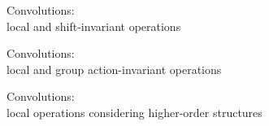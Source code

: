 \documentclass[landscape,a0paper,blockverticalspace = 7mm]{tikzposter}
\begin{document}
\begin{columns}
{{\begin{center}
\begin{minipage}{0.2\linewidth}
\begin{center}
        
          \end{center}
      \end{minipage} 
     
    \end{center}
\vspace{1cm}
\begin{center}
\begin{minipage}{0.2\linewidth}
\vspace{-1.5cm}
		\begin{center}
		Convolutions: 
		\\ local and shift-invariant operations 	 
	\end{center}		       
      
      \end{minipage}
      \begin{minipage}{0.1\linewidth}
      \vspace{-2cm}
         \begin{center}
         
		   
	\end{center}
      \end{minipage} 
	\begin{minipage}{0.2\linewidth}
	\vspace{-1.5cm}
         \begin{center}
		Convolutions: 
		\\ local and group action-invariant	operations
	\end{center}
      \end{minipage}
      \begin{minipage}{0.1\linewidth}
      \vspace{-2cm}
         \begin{center}
         
		   
	\end{center}
      \end{minipage} 
	\begin{minipage}{0.2\linewidth}
	\vspace{-1.5cm}
         \begin{center}
		Convolutions: 
		\\ local operations considering higher-order structures 	
	\end{center}
      \end{minipage}
       \end{center}


}}
\end{columns}
\end{document}
